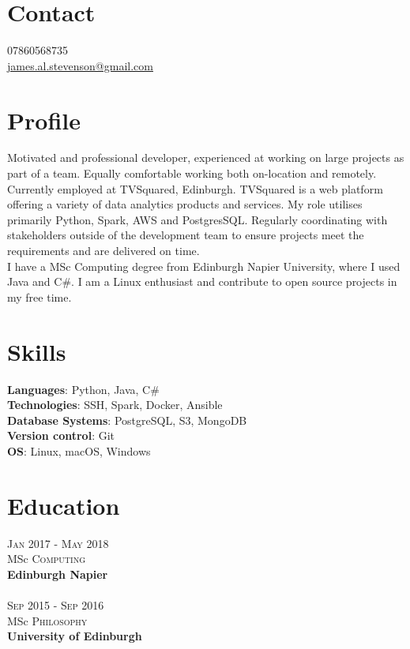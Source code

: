 \documentclass[14pt, a4paper]{extarticle}
\begin{document}
\par{\bigskip\par
\section{Contact}
\large
07860568735\\
\href{mailto:james.al.stevenson@gmail.com}{james.al.stevenson@gmail.com}\\
}

\begin{multicols}{2}

\section{Profile}
\noindent Motivated and professional developer, experienced at working on large projects as part of a team. Equally comfortable working both on-location and remotely.\\
Currently employed at TVSquared, Edinburgh. TVSquared is a web platform offering a variety of data analytics products and services. My role utilises primarily Python, Spark, AWS and PostgresSQL. Regularly coordinating with stakeholders outside of the development team to ensure projects meet the requirements and are delivered on time.\\
I have a MSc Computing degree from Edinburgh Napier University, where I used Java and C\#. I am a Linux enthusiast and contribute to open source projects in my free time.

\section{Skills}
\noindent\textbf{Languages}: Python, Java, C\#\\
\textbf{Technologies}: SSH, Spark, Docker, Ansible\\
\textbf{Database Systems}: PostgreSQL, S3, MongoDB\\
\textbf{Version control}: Git\\
\textbf{OS}: Linux, macOS, Windows

\section{Education}
\noindent\textsc{Jan} 2017 - \textsc{May} 2018\\
MSc \textsc{Computing} \\
\textbf{Edinburgh Napier}\\~\\
\textsc{Sep} 2015 - \textsc{Sep} 2016\\
MSc \textsc{Philosophy} \\
\textbf{University of Edinburgh}


\end{multicols}
\end{document}
